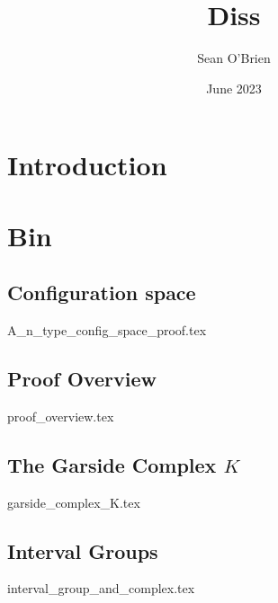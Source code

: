 \documentclass{article}
\title{Diss}
\author{Sean O'Brien}
\date{June 2023}
\begin{document}
\maketitle

\section{Introduction}

\section{Bin}

\subsection{Configuration space}
{A_n_type_config_space_proof.tex}


\subsection{Proof Overview}
{proof_overview.tex}

\subsection{The Garside Complex $K$}
{garside_complex_K.tex}
\subsection{Interval Groups}
{interval_group_and_complex.tex}


\printbibliography
\end{document}

